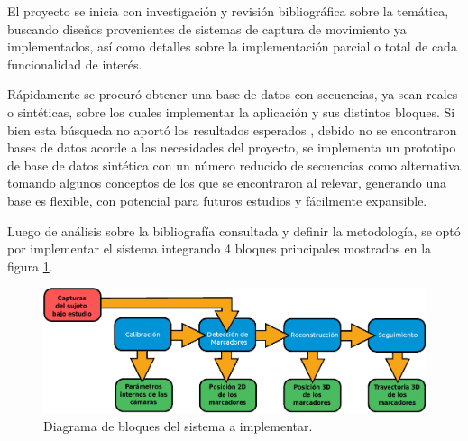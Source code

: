 \vspace{5 mm}

El proyecto se inicia con investigación y revisión bibliográfica sobre la temática, buscando diseños provenientes de sistemas de captura de movimiento ya implementados, así como  detalles sobre la implementación parcial o total de cada funcionalidad de interés. 

Rápidamente se procuró obtener una base de datos con secuencias, ya sean reales o sintéticas, sobre los cuales implementar la aplicación y sus distintos bloques. Si bien esta búsqueda no aportó los resultados esperados
, debido no se encontraron bases de datos acorde a las necesidades del proyecto, se implementa un prototipo de base de datos sintética con un número reducido de secuencias como alternativa tomando algunos conceptos de los que se encontraron al relevar, generando una base es flexible, con potencial para futuros estudios y fácilmente expansible.

 Luego de análisis sobre la bibliografía consultada y definir la metodología, se optó por implementar el sistema integrando 4 bloques principales mostrados en la figura \ref{bloquesSistintro}. 

 \begin{figure}[H]
\begin{center}
\includegraphics[scale=0.8]{img/Sistema_completo/Diagrama_de_bloques.eps}
\end{center}
\caption{Diagrama de bloques del sistema a implementar.}
\label{bloquesSistintro}
\end{figure}

